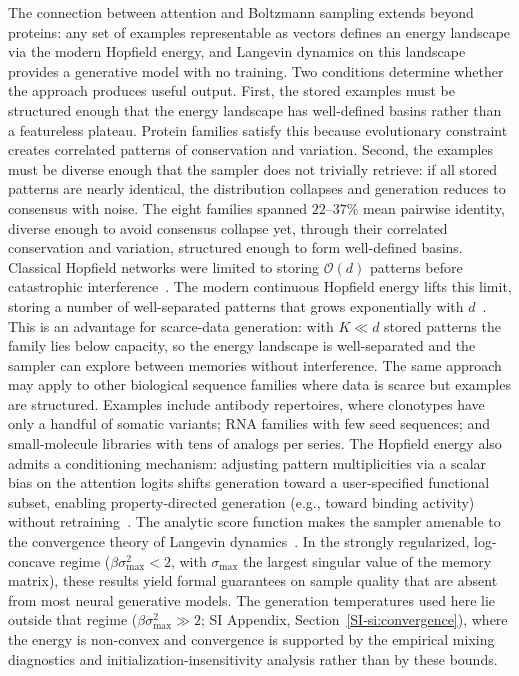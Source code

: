 \documentclass[11pt,onecolumn,twoside,lineno]{pnas-new}
\begin{document}
The connection between attention and Boltzmann sampling extends beyond proteins: any set of examples representable as vectors defines an energy landscape via the modern Hopfield energy, and Langevin dynamics on this landscape provides a generative model with no training. Two conditions determine whether the approach produces useful output. First, the stored examples must be structured enough that the energy landscape has well-defined basins rather than a featureless plateau. Protein families satisfy this because evolutionary constraint creates correlated patterns of conservation and variation. Second, the examples must be diverse enough that the sampler does not trivially retrieve: if all stored patterns are nearly identical, the distribution collapses and generation reduces to consensus with noise. The eight families spanned $22$--$37\%$ mean pairwise identity, diverse enough to avoid consensus collapse yet, through their correlated conservation and variation, structured enough to form well-defined basins. Classical Hopfield networks were limited to storing $\mathcal{O}(d)$ patterns before catastrophic interference~\cite{hopfieldNeuralNetworksPhysical1982,amitStoringInfiniteNumbers1985}. The modern continuous Hopfield energy lifts this limit, storing a number of well-separated patterns that grows exponentially with $d$~\cite{ramsauerHopfieldNetworksAll2021}. This is an advantage for scarce-data generation: with $K \ll d$ stored patterns the family lies below capacity, so the energy landscape is well-separated and the sampler can explore between memories without interference. The same approach may apply to other biological sequence families where data is scarce but examples are structured. Examples include antibody repertoires, where clonotypes have only a handful of somatic variants; RNA families with few seed sequences; and small-molecule libraries with tens of analogs per series. The Hopfield energy also admits a conditioning mechanism: adjusting pattern multiplicities via a scalar bias on the attention logits shifts generation toward a user-specified functional subset, enabling property-directed generation (e.g., toward binding activity) without retraining~\cite{varnerConditioningProtein2026}. The analytic score function makes the sampler amenable to the convergence theory of Langevin dynamics~\cite{durmusNonasymptoticAnalysisUnadjusted2017,dalalyanTheoreticalGuaranteesApproximate2017}. In the strongly regularized, log-concave regime ($\beta\sigma_{\max}^2 < 2$, with $\sigma_{\max}$ the largest singular value of the memory matrix), these results yield formal guarantees on sample quality that are absent from most neural generative models. The generation temperatures used here lie outside that regime ($\beta\sigma_{\max}^2 \gg 2$; SI Appendix, Section~\ref{SI-si:convergence}), where the energy is non-convex and convergence is supported by the empirical mixing diagnostics and initialization-insensitivity analysis rather than by these bounds.
\end{document}
